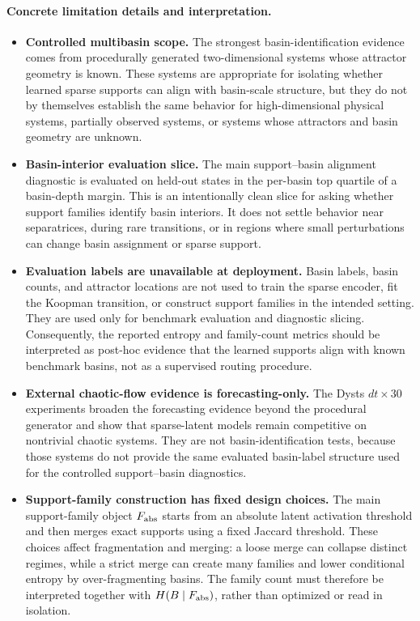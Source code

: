 \paragraph{Concrete limitation details and interpretation.}
\begin{itemize}
  \item \textbf{Controlled multibasin scope.}
  The strongest basin-identification evidence comes from procedurally generated
  two-dimensional systems whose attractor geometry is known.  These systems are
  appropriate for isolating whether learned sparse supports can align with
  basin-scale structure, but they do not by themselves establish the same
  behavior for high-dimensional physical systems, partially observed systems, or
  systems whose attractors and basin geometry are unknown.

  \item \textbf{Basin-interior evaluation slice.}
  The main support--basin alignment diagnostic is evaluated on held-out states in
  the per-basin top quartile of a basin-depth margin.  This is an intentionally
  clean slice for asking whether support families identify basin interiors.  It
  does not settle behavior near separatrices, during rare transitions, or in
  regions where small perturbations can change basin assignment or sparse
  support.

  \item \textbf{Evaluation labels are unavailable at deployment.}
  Basin labels, basin counts, and attractor locations are not used to train the
  sparse encoder, fit the Koopman transition, or construct support families in
  the intended setting.  They are used only for benchmark evaluation and
  diagnostic slicing.  Consequently, the reported entropy and family-count
  metrics should be interpreted as post-hoc evidence that the learned supports
  align with known benchmark basins, not as a supervised routing procedure.

  \item \textbf{External chaotic-flow evidence is forecasting-only.}
  The Dysts \(dt{\times}30\) experiments broaden the forecasting evidence beyond
  the procedural generator and show that sparse-latent models remain competitive
  on nontrivial chaotic systems.  They are not basin-identification tests,
  because those systems do not provide the same evaluated basin-label structure
  used for the controlled support--basin diagnostics.

  \item \textbf{Support-family construction has fixed design choices.}
  The main support-family object \(F_{\rm abs}\) starts from an absolute latent
  activation threshold and then merges exact supports using a fixed Jaccard
  threshold.  These choices affect fragmentation and merging: a loose merge can
  collapse distinct regimes, while a strict merge can create many families and
  lower conditional entropy by over-fragmenting basins.  The family count must
  therefore be interpreted together with \(H(B\mid F_{\rm abs})\), rather than
  optimized or read in isolation.


\end{itemize}
